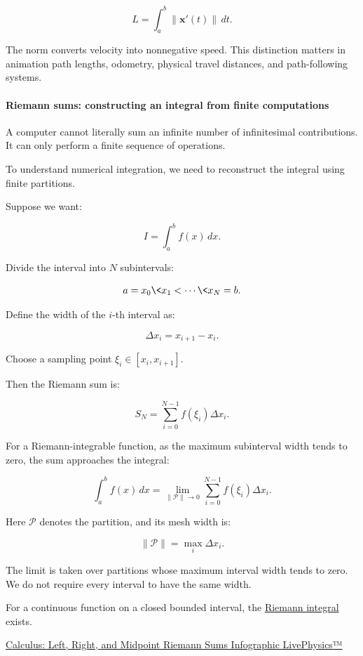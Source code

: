 \[
\boxed{ L=\int_a^b\|\mathbf x'(t)\|\,dt }.
\]

The norm converts velocity into nonnegative speed. This distinction matters in animation path lengths, odometry, physical travel distances, and path-following systems.

\paragraph{Riemann sums: constructing an integral from finite computations}\label{riemann-sums-constructing-an-integral-from-finite-computations}

A computer cannot literally sum an infinite number of infinitesimal contributions. It can only perform a finite sequence of operations.

To understand numerical integration, we need to reconstruct the integral using finite partitions.

Suppose we want:

\[
I=\int_a^b f(x)\,dx.
\]

Divide the interval into \(N\) subintervals:

\[
a=x_0\<x_1<\cdots\<x_N=b.
\]

Define the width of the \(i\)-th interval as:

\[
\Delta x_i=x_{i+1}-x_i.
\]

Choose a sampling point \(\xi_i\in[x_i,x_{i+1}]\).

Then the Riemann sum is:

\[
S_N=\sum_{i=0}^{N-1}f(\xi_i)\Delta x_i.
\]

For a Riemann-integrable function, as the maximum subinterval width tends to zero, the sum approaches the integral:

\[
\boxed{ \int_a^b f(x)\,dx = \lim_{\|\mathcal P\|\to0} \sum_{i=0}^{N-1}f(\xi_i)\Delta x_i }.
\]

Here \(\mathcal P\) denotes the partition, and its mesh width is:

\[
\|\mathcal P\|=\max_i\Delta x_i.
\]

The limit is taken over partitions whose maximum interval width tends to zero. We do not require every interval to have the same width.

For a continuous function on a closed bounded interval, the \hyperref[02-foundations-ii-ch022]{Riemann integral} exists.

\href{https://images.openai.com/static-rsc-4/t5MkAz-2qFGici8ndHfZur9gQtfdWJYL32F6n8G88ZHPGmAsnDRse5qe5xfYJJ4GJcZqh8uYwSaYHOu9cPkLr8aB6FomkHL4VOpXoOryLK4Ee1f_NR5LPcOGaSAMPsLd58tQ6P4H7c9PoHrfy0mY3unWO2wadUnb798uxKmCL0Y?purpose=inline}{Calculus: Left, Right, and Midpoint Riemann Sums Infographic \textbar{} LivePhysics™}

